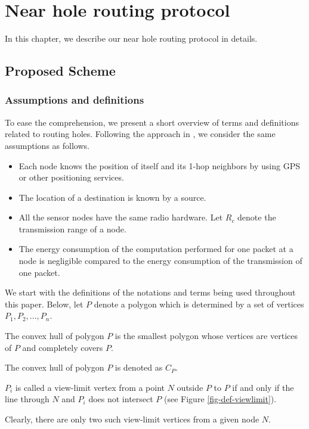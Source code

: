\chapter{Near hole routing protocol}\label{chapter4}
In this chapter, we describe our near hole routing protocol in details. 
\section{Proposed Scheme}
\subsection{Assumptions and definitions}
To ease the comprehension, we present a short overview of terms and definitions related to routing holes. Following the approach in \cite{ehds,elbar,issnip}, we consider the same assumptions as follows.
\begin{itemize}
\item Each node knows the position of itself and its 1-hop neighbors by using GPS or other positioning services.
\item The location of a destination is known by a source.
\item All the sensor nodes have the same radio hardware. Let $R_c$ denote the transmission range of a node.
\item The energy consumption of the computation performed for one packet at a node is negligible compared to the energy consumption of the transmission of one packet.
\end{itemize}
We start with the definitions of the notations and terms being used throughout this paper. Below, let $P$ denote a polygon which is determined by a set of vertices $P_1, P_2, ..., P_n$.

\begin{mydef}
The convex hull of polygon $P$ is the smallest polygon whose vertices are vertices of $P$ and completely covers $P$.
\end{mydef}
The convex hull of polygon $P$ is denoted as $C_P$.

\begin{mydef}\label{def-view-limit-vertex}
$P_i$ is called a view-limit vertex from a point $N$ outside $P$ to $P$ if and only if the line through $N$ and $P_i$ does not intersect $P$ (see Figure \ref{fig-def-viewlimit}).
\end{mydef}
Clearly, there are only two such view-limit vertices from a given node $N$.

